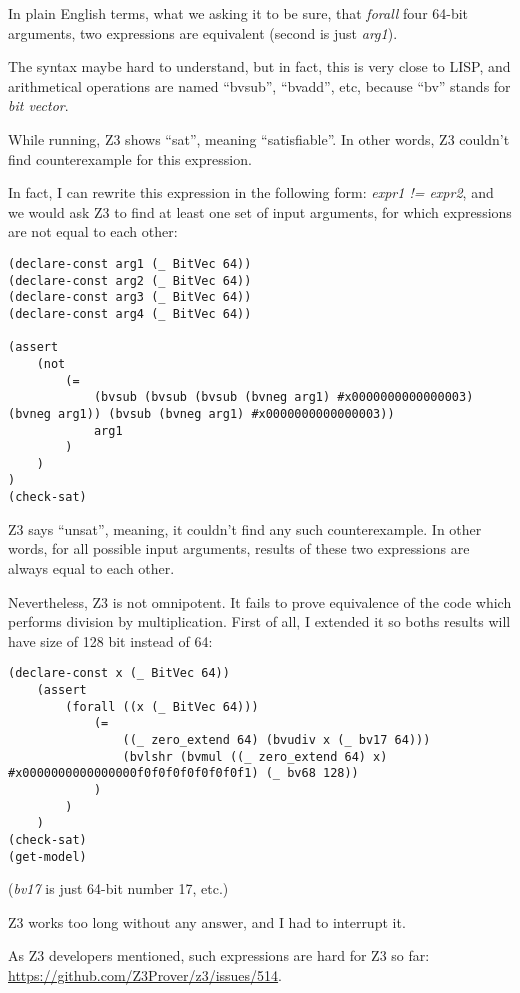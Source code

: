 ﻿\documentclass[12pt]{article}
\begin{document}
In plain English terms, what we asking it to be sure, that \textit{forall} four 64-bit arguments, two expressions
are equivalent (second is just \textit{arg1}).

The syntax maybe hard to understand, but in fact, this is very close to LISP, and arithmetical operations
are named ``bvsub'', ``bvadd'', etc, because ``bv'' stands for \textit{bit vector}.

While running, Z3 shows ``sat'', meaning ``satisfiable''.
In other words, Z3 couldn't find counterexample for this expression.

In fact, I can rewrite this expression in the following form: \textit{expr1 != expr2}, and we would ask
Z3 to find at least one set of input arguments, for which expressions are not equal to each other:

\begin{lstlisting}
(declare-const arg1 (_ BitVec 64))
(declare-const arg2 (_ BitVec 64))
(declare-const arg3 (_ BitVec 64))
(declare-const arg4 (_ BitVec 64))

(assert
    (not
        (=
            (bvsub (bvsub (bvsub (bvneg arg1) #x0000000000000003) (bvneg arg1)) (bvsub (bvneg arg1) #x0000000000000003))
            arg1
        )
    )
)
(check-sat)
\end{lstlisting}

Z3 says ``unsat'', meaning, it couldn't find any such counterexample.
In other words, for all possible input arguments, results of these two expressions are always equal to each other.

Nevertheless, Z3 is not omnipotent.
It fails to prove equivalence of the code which performs division by multiplication.
First of all, I extended it so boths results will have size of 128 bit instead of 64:

\begin{lstlisting}
(declare-const x (_ BitVec 64))
    (assert
        (forall ((x (_ BitVec 64)))
            (=
                ((_ zero_extend 64) (bvudiv x (_ bv17 64)))
                (bvlshr (bvmul ((_ zero_extend 64) x) #x0000000000000000f0f0f0f0f0f0f0f1) (_ bv68 128))
            )
        )
    )
(check-sat)
(get-model)
\end{lstlisting}

(\textit{bv17} is just 64-bit number 17, etc.)

Z3 works too long without any answer, and I had to interrupt it.

As Z3 developers mentioned, such expressions are hard for Z3 so far:
\url{https://github.com/Z3Prover/z3/issues/514}.
\end{document}
